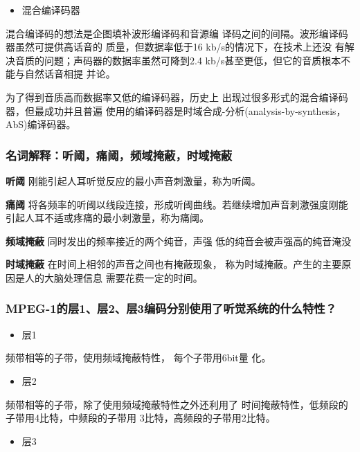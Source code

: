 \documentclass[UTF8,a4paper,AutoFakeBold,AutoFakeSlant]{ctexart}
\begin{document}
\begin{itemize}
	\item 混合编译码器
\end{itemize}

混合编译码的想法是企图填补波形编译码和音源编
译码之间的间隔。波形编译码器虽然可提供高话音的
质量，但数据率低于16 kb/s的情况下，在技术上还没
有解决音质的问题；声码器的数据率虽然可降到2.4 
kb/s甚至更低，但它的音质根本不能与自然话音相提
并论。

为了得到音质高而数据率又低的编译码器，历史上
出现过很多形式的混合编译码器，但最成功并且普遍
使用的编译码器是时域合成-分析(analysis-by-synthesis，
AbS)编译码器。


\subsubsection{名词解释：听阈，痛阈，频域掩蔽，时域掩蔽}

\textbf{听阈}
刚能引起人耳听觉反应的最小声音刺激量，称为听阈。

\textbf{痛阈}
将各频率的听阈以线段连接，形成听阈曲线。若继续增加声音刺激强度刚能引起人耳不适或疼痛的最小刺激量，称为痛阈。

\textbf{频域掩蔽}
同时发出的频率接近的两个纯音，声强
低的纯音会被声强高的纯音淹没

\textbf{时域掩蔽}
在时间上相邻的声音之间也有掩蔽现象，
称为时域掩蔽。产生的主要原因是人的大脑处理信息
需要花费一定的时间。


\subsubsection{MPEG-1的层1、层2、层3编码分别使用了听觉系统的什么特性？}

\begin{itemize}
	\item 层1
\end{itemize}

频带相等的子带，使用频域掩蔽特性， 每个子带用6bit量
化。

\begin{itemize}
	\item 层2
\end{itemize}

频带相等的子带，除了使用频域掩蔽特性之外还利用了
时间掩蔽特性，低频段的子带用4比特，中频段的子带用
3比特，高频段的子带用2比特。

\begin{itemize}
	\item 层3
\end{itemize}
\end{document}
